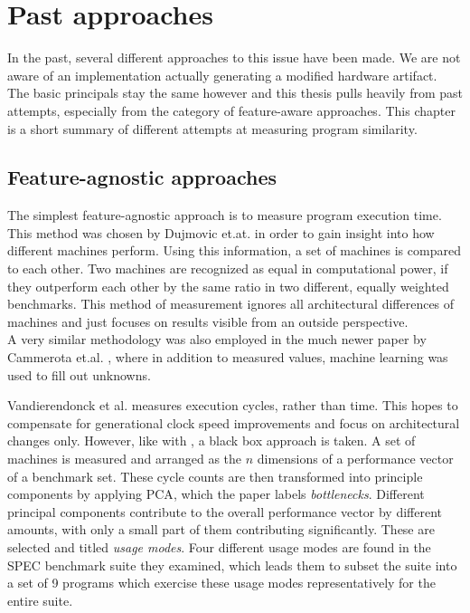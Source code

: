\documentclass[../bachelor_paper.tex]{subfiles}
\begin{document}
\chapter{Past approaches}
	\label{ch:prob}
In the past, several different approaches to this issue have been made. We are not aware of an implementation actually generating a modified hardware artifact. The basic principals stay the same however and this thesis pulls heavily from past attempts, especially from the category of feature-aware approaches. This chapter is a short summary of different attempts at measuring program similarity.

\section{Feature-agnostic approaches}
	\label{sec:prob/agno}
The simplest feature-agnostic approach is to measure program execution time. This method was chosen by Dujmovic et.at. \cite{dujmovicEvolutionEvaluationSPEC1998} in order to gain insight into how different machines perform. Using this information, a set of machines is compared to each other. Two machines are recognized as equal in computational power, if they outperform each other by the same ratio in two different, equally weighted benchmarks. This method of measurement ignores all architectural differences of machines and just focuses on results visible from an outside perspective.\\
A very similar methodology was also employed in the much newer paper by Cammerota et.al. \cite{cammarotaOptimizingProgramPerformance2013}, where in addition to measured values, machine learning was used to fill out unknowns.

Vandierendonck et al. \cite{vandierendonckManyBenchmarksStress} measures execution cycles, rather than time. This hopes to compensate for generational clock speed improvements and focus on architectural changes only. However, like with \cite{dujmovicEvolutionEvaluationSPEC1998}, a black box approach is taken. A set of machines is measured and arranged as the $n$ dimensions of a performance vector of a benchmark set. These cycle counts are then transformed into principle components by applying \ac{PCA}, which the paper labels \emph{bottlenecks}. Different principal components contribute to the overall performance vector by different amounts, with only a small part of them contributing significantly. These are selected and titled \emph{usage modes}. Four different usage modes are found in the \ac{SPEC} benchmark suite they examined, which leads them to subset the suite into a set of 9 programs which exercise these usage modes representatively for the entire suite.
\end{document}
